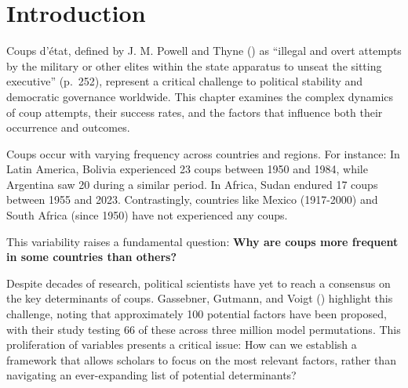 \documentclass[
  12pt,
]{report}
\begin{document}
\newpage

\section{Introduction}\label{introduction-1}

Coups d'état, defined by J. M. Powell and Thyne
() as ``illegal and overt attempts by the
military or other elites within the state apparatus to unseat the
sitting executive'' (p.~252), represent a critical challenge to
political stability and democratic governance worldwide. This chapter
examines the complex dynamics of coup attempts, their success rates, and
the factors that influence both their occurrence and outcomes.

Coups occur with varying frequency across countries and regions. For
instance: In Latin America, Bolivia experienced 23 coups between 1950
and 1984, while Argentina saw 20 during a similar period. In Africa,
Sudan endured 17 coups between 1955 and 2023. Contrastingly, countries
like Mexico (1917-2000) and South Africa (since 1950) have not
experienced any coups.

This variability raises a fundamental question: \textbf{Why are coups
more frequent in some countries than others?}

Despite decades of research, political scientists have yet to reach a
consensus on the key determinants of coups. Gassebner, Gutmann, and
Voigt () highlight this challenge,
noting that approximately 100 potential factors have been proposed, with
their study testing 66 of these across three million model permutations.
This proliferation of variables presents a critical issue: How can we
establish a framework that allows scholars to focus on the most relevant
factors, rather than navigating an ever-expanding list of potential
determinants?

\begingroup
\setlength{}
\setlength{}\fontsize{12.0pt}{14.4pt}\selectfont
\setlength{\LTpost}{0mm}
\end{document}
